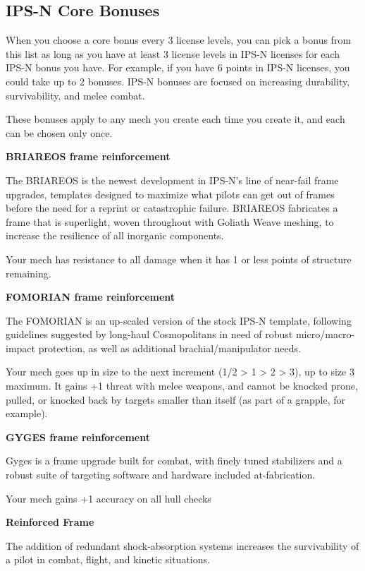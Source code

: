 \subsection{IPS-N Core Bonuses}

When you choose a core bonus every 3 license levels, you can pick a bonus from this list as long as you have at least 3 license levels in IPS-N licenses for each IPS-N bonus you have. For example, if you have 6 points in IPS-N licenses, you could take up to 2 bonuses. IPS-N bonuses are focused on increasing durability, survivability, and melee combat.

These bonuses apply to any mech you create each time you create it, and each can be chosen only once.


\textbf{BRIAREOS frame reinforcement}

The BRIAREOS is the newest development in IPS-N's line of near-fail frame upgrades, templates designed to maximize what pilots can get out of frames before the need for a reprint or catastrophic failure. BRIAREOS fabricates a frame that is superlight, woven throughout with Goliath Weave meshing, to increase the resilience of all inorganic components.

Your mech has resistance to all damage when it has 1 or less points of structure remaining.


\textbf{FOMORIAN frame reinforcement}

The FOMORIAN is an up-scaled version of the stock IPS-N template, following guidelines suggested by long-haul Cosmopolitans in need of robust micro/macro-impact protection, as well as additional brachial/manipulator needs.

Your mech goes up in size to the next increment (1/2 > 1 > 2 > 3), up to size 3 maximum. It gains +1 threat with melee weapons, and cannot be knocked prone, pulled, or knocked back by targets smaller than itself (as part of a grapple, for example).


\textbf{GYGES frame reinforcement}

Gyges is a frame upgrade built for combat, with finely tuned stabilizers and a robust suite of targeting software and hardware included at-fabrication.

Your mech gains +1 accuracy on all hull checks


\textbf{Reinforced Frame}

The addition of redundant shock-absorption systems increases the survivability of a pilot in combat, flight, and kinetic situations.

